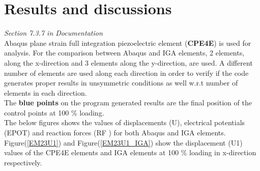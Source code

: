 \documentclass[12pt]{article}
\begin{document}
\section{Results and discussions} \label{RSD2DPPUML}
\emph{Section 7.3.7 in Documentation}\\
Abaqus plane strain full integration piezoelectric element (\textbf{CPE4E}) is used for analysis. For the comparison between Abaqus and IGA elements, 2 elements, along the x-direction and 3 elements along the y-direction, are used. A different number of elements are used along each direction in order to verify if the code generates proper results in unsymmetric conditions as well w.r.t number of elements in each direction.\\
The \textbf{blue points} on the program generated results are the final position of the control points at 100 \% loading.\\
The below figures shows the values of displacements (U), electrical potentials (EPOT) and reaction forces (RF ) for both Abaqus and IGA elements.\\
Figure(\ref{EM23U1}) and Figure(\ref{EM23U1_IGA}) show the displacement (U1) values of the CPE4E elements and IGA elements at 100 \% loading in x-direction respectively. \\
\end{document}
